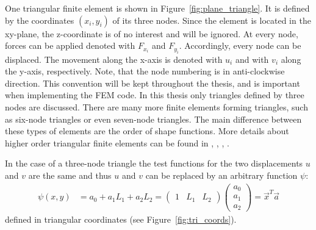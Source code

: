   One triangular finite element is shown in Figure~\ref{fig:plane_triangle}. It is defined by the coordinates $(x_i,y_i)$ of its three nodes. Since the element is located in the xy-plane, the z-coordinate is of no interest and will be ignored. At every node, forces can be applied denoted with $F_{x_i}$ and $F_{y_i}$. Accordingly, every node can be displaced. The movement along the x-axis is denoted with $u_i$ and with $v_i$ along the y-axis, respectively. Note, that the node numbering is in anti-clockwise direction. This convention will be kept throughout the thesis, and is important when implementing the FEM code.
  In this thesis only triangles defined by three nodes are discussed. There are many more finite elements forming triangles, such as six-node triangles or even seven-node triangles. The main difference between these types of elements are the order of shape functions. More details about higher order triangular finite elements can be found in \cite{zienkiewicz2000finite}, \cite{bergan1985triangular}, \cite{cook2002concepts}, \cite{braess2007finite}.
  
  In the case of a three-node triangle the test functions for the two displacements $u$ and $v$ are the same and thus $u$ and $v$ can be replaced by an arbitrary function $\psi$\cite{steinke2005finite}:
  \begin{align}\label{eq:t3_ansatz}
  \psi(x,y) &= a_0 + a_1L_1 + a_2L_2 = \begin{pmatrix}
  1 & L_1 & L_2
  \end{pmatrix} \begin{pmatrix}
  a_0 \\ a_1 \\ a_2
  \end{pmatrix} = \vec{x}^T \vec{a}
  \end{align}
  defined in triangular coordinates (see Figure~\ref{fig:tri_coords}).
  
